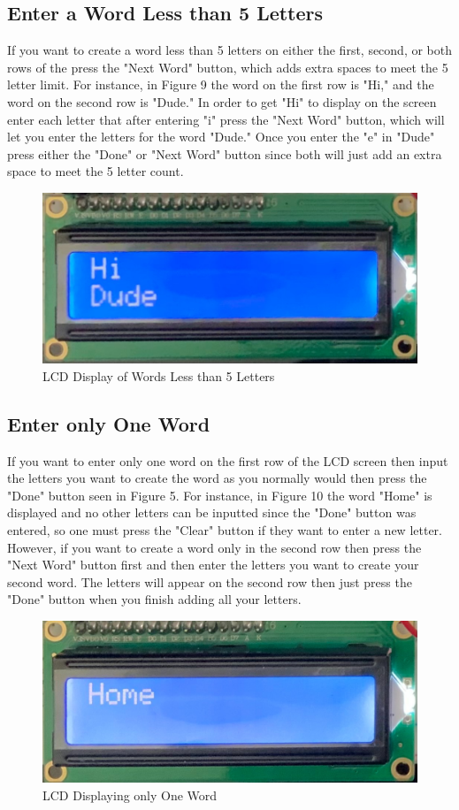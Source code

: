\documentclass{article}
\begin{document}
\subsection{Enter a Word Less than 5 Letters}
If you want to create a word less than 5 letters on either the first, second, or both rows of the press the "Next 
Word" button, which adds extra spaces to meet the 5 letter limit. For instance, in Figure 9 the word on the first 
row is "Hi," and the word on the second row is "Dude." In order to get "Hi" to display on the screen enter each
letter that after entering "i" press the "Next Word" button, which will let you enter the letters for the word
"Dude." Once you enter the "e" in "Dude" press either the "Done" or "Next Word" button since both will just add 
an extra space to meet the 5 letter count. 


\begin{figure} [ht!]
\centering
\includegraphics[width=0.7\linewidth]{Less5.jpg}
  \caption{LCD Display of Words Less than 5 Letters}
  \label{fig:fig9}
\end{figure}


\subsection{Enter only One Word}
If you want to enter only one word on the first row of the LCD screen then input the letters you want to create the 
word as you normally would then press the "Done" button seen in Figure 5. For instance, in Figure 10 the word
"Home" is displayed and no other letters can be inputted since the "Done" button was entered, so one must
press the "Clear" button if they want to enter a new letter. However, if you want to create a word only in the 
second row then press the "Next Word" button first and then enter the letters you want to create your second
word. The letters will appear on the second row then just press the "Done" button when you finish adding 
all your letters.

\begin{figure} [ht!]
\centering
\includegraphics[width=0.7\linewidth]{Home.jpg}
  \caption{LCD Displaying only One Word}
  \label{fig:fig10}
\end{figure}
\end{document}
